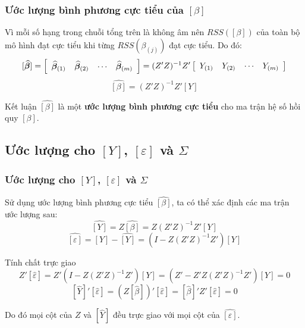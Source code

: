 \begin{frame}
\frametitle{Ước lượng bình phương cực tiểu của $[\beta]$}
Vì mỗi số hạng trong chuỗi tổng trên là không âm nên $RSS([\beta])$ của toàn bộ mô hình đạt cực tiểu khi từng $RSS(\beta_{(j)})$ đạt cực tiểu.  
Do đó:
\[
[\widehat{\boldsymbol{\beta}}]
=
\left[
\begin{array}{c: c: c: c}
\widehat{\boldsymbol{\beta}}_{(1)} & 
\widehat{\boldsymbol{\beta}}_{(2)} &
\cdots &
\widehat{\boldsymbol{\beta}}_{(m)}
\end{array}
\right]
=
(Z'Z)^{-1}Z'
\left[
\begin{array}{c: c: c: c}
Y_{(1)} &
Y_{(2)} &
\cdots &
Y_{(m)}
\end{array}
\right]
\]
\[
\boxed{
\widehat{[\beta]} = (Z'Z)^{-1}Z'[Y]
}
\]
\begin{block}{Kết luận}
$\widehat{[\beta]}$ là một \textbf{ước lượng bình phương cực tiểu} cho ma trận hệ số hồi quy $[\beta]$.
\end{block}
\end{frame}

\subsection{Ước lượng cho \texorpdfstring{$[Y]$, $[\varepsilon]$ và $\Sigma$}{[Y], [epsilon] và Σ}}
\begin{frame}
\frametitle{Ước lượng cho $[Y]$, $[\varepsilon]$ và $\Sigma$}
Sử dụng ước lượng bình phương cực tiểu $\widehat{[\beta]}$, ta có thể xác định các ma trận ước lượng sau:
\[
\widehat{[Y]} = Z\widehat{[\beta]} 
= Z(Z'Z)^{-1}Z'[Y]
\]
\[
\widehat{[\varepsilon]} = [Y] - \widehat{[Y]} 
= (I - Z(Z'Z)^{-1}Z')[Y]
\]
\begin{block}{Tính chất trực giao}
\[
Z'[\widehat{\varepsilon}] = Z'(I - Z(Z'Z)^{-1}Z')[Y] 
= (Z' - Z'Z(Z'Z)^{-1}Z')[Y] = 0
\]
\[
[\widehat{Y}]'[\widehat{\varepsilon}]
= (Z[\widehat{\beta}])'[\widehat{\varepsilon}]
= [\widehat{\beta}]'Z'[\widehat{\varepsilon}]
= 0
\]
\end{block}
Do đó mọi cột của $Z$ và $[\widehat{Y}]$ đều trực giao với mọi cột của $\widehat{[\varepsilon]}$.  

\end{frame}

